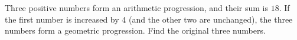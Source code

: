 Three positive numbers form an arithmetic progression, and their sum is $18$. If the first number is increased by $4$ (and the other two are unchanged), the three numbers form a geometric progression. Find the original three numbers.
